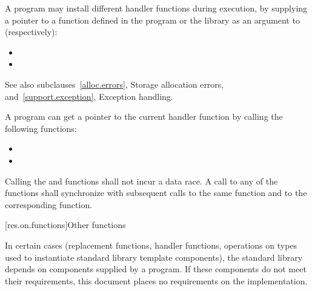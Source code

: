 \pnum
A \Cpp{} program may install different handler functions during execution, by
supplying a pointer to a function defined in the program or the library
as an argument to (respectively):
\begin{itemize}
\item {}
\item {}
\end{itemize}
See also subclauses~\ref{alloc.errors}, Storage allocation errors, and~\ref{support.exception},
Exception handling.

\pnum
A \Cpp{} program can get a pointer to the current handler function by calling the following
functions:
\begin{itemize}
\item
{}%
\item
{}
\end{itemize}

\pnum
Calling the  and  functions shall not incur a data race. A call to
any of the  functions shall synchronize with subsequent calls to the same
 function and to the corresponding  function.

[res.on.functions]{Other functions}

\pnum
In certain cases (replacement functions, handler functions, operations on types used to
instantiate standard library template components), the \Cpp{} standard library depends on
components supplied by a \Cpp{} program.
If these components do not meet their requirements, this document places no requirements
on the implementation.

